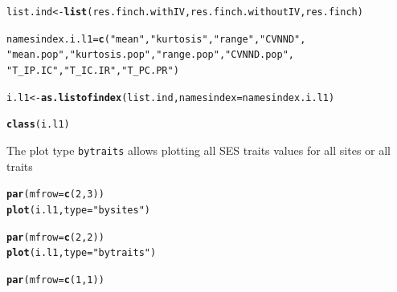 \documentclass[12pt]{article}\usepackage[]{graphicx}\usepackage[]{color}
\makeatletter
\newcommand{\hlnum}[1]{\textcolor[rgb]{0.686,0.059,0.569}{#1}}%
\newcommand{\hlstr}[1]{\textcolor[rgb]{0.192,0.494,0.8}{#1}}%
\newcommand{\hlstd}[1]{\textcolor[rgb]{0.345,0.345,0.345}{#1}}%
\newcommand{\hlkwb}[1]{\textcolor[rgb]{0.69,0.353,0.396}{#1}}%
\newcommand{\hlkwc}[1]{\textcolor[rgb]{0.333,0.667,0.333}{#1}}%
\newcommand{\hlkwd}[1]{\textcolor[rgb]{0.737,0.353,0.396}{\textbf{#1}}}%
\newenvironment{kframe}{%
 \def\at@end@of@kframe{}%
 \ifinner\ifhmode%
  \def\at@end@of@kframe{\end{minipage}}%
  \begin{minipage}{\columnwidth}%
 \fi\fi%
 \def\FrameCommand##1{\hskip\@totalleftmargin \hskip-\fboxsep
 \colorbox{shadecolor}{##1}\hskip-\fboxsep
     \hskip-\linewidth \hskip-\@totalleftmargin \hskip\columnwidth}%
 \MakeFramed {\advance\hsize-\width
   \@totalleftmargin\z@ \linewidth\hsize
   \@setminipage}}%
 {\par\unskip\endMakeFramed%
 \at@end@of@kframe}
\newenvironment{knitrout}{}{} %
\makeatother
\begin{document}
\begin{knitrout}
\color{fgcolor}\begin{kframe}
\begin{alltt}
\hlstd{list.ind}\hlkwb{<-}\hlkwd{list}\hlstd{(res.finch.withIV, res.finch.withoutIV, res.finch)}
\end{alltt}


{\ttfamily\noindent\bfseries\color{errorcolor}{\#\# Error: objet 'res.finch.withIV' introuvable}}\begin{alltt}
\hlstd{namesindex.i.l1} \hlkwb{=} \hlkwd{c}\hlstd{(}\hlstr{"mean"}\hlstd{,} \hlstr{"kurtosis"}\hlstd{,} \hlstr{"range"}\hlstd{,} \hlstr{"CVNND"}\hlstd{,}
         \hlstr{"mean.pop"}\hlstd{,} \hlstr{"kurtosis.pop"}\hlstd{,} \hlstr{"range.pop"}\hlstd{,} \hlstr{"CVNND.pop"}\hlstd{,}
         \hlstr{"T_IP.IC"}\hlstd{,} \hlstr{"T_IC.IR"}\hlstd{,} \hlstr{"T_PC.PR"}\hlstd{)}

\hlstd{i.l1}\hlkwb{<-}\hlkwd{as.listofindex}\hlstd{(list.ind,} \hlkwc{namesindex} \hlstd{= namesindex.i.l1)}
\end{alltt}


{\ttfamily\noindent\bfseries\color{errorcolor}{\#\# Error: objet 'list.ind' introuvable}}\begin{alltt}
\hlkwd{class}\hlstd{(i.l1)}
\end{alltt}


{\ttfamily\noindent\bfseries\color{errorcolor}{\#\# Error: objet 'i.l1' introuvable}}\end{kframe}
\end{knitrout}

The plot type \texttt{bytraits} allows plotting all SES traits values for all sites or all traits
\begin{knitrout}
\color{fgcolor}\begin{kframe}
\begin{alltt}
\hlkwd{par}\hlstd{(}\hlkwc{mfrow} \hlstd{=} \hlkwd{c}\hlstd{(}\hlnum{2}\hlstd{,}\hlnum{3}\hlstd{))}
\hlkwd{plot}\hlstd{(i.l1,}\hlkwc{type} \hlstd{=} \hlstr{"bysites"}\hlstd{)}
\end{alltt}


{\ttfamily\noindent\bfseries\color{errorcolor}{\#\# Error: objet 'i.l1' introuvable}}\begin{alltt}
\hlkwd{par}\hlstd{(}\hlkwc{mfrow} \hlstd{=} \hlkwd{c}\hlstd{(}\hlnum{2}\hlstd{,}\hlnum{2}\hlstd{))}
\hlkwd{plot}\hlstd{(i.l1,}\hlkwc{type} \hlstd{=} \hlstr{"bytraits"}\hlstd{)}
\end{alltt}


{\ttfamily\noindent\bfseries\color{errorcolor}{\#\# Error: objet 'i.l1' introuvable}}\begin{alltt}
\hlkwd{par}\hlstd{(}\hlkwc{mfrow} \hlstd{=} \hlkwd{c}\hlstd{(}\hlnum{1}\hlstd{,}\hlnum{1}\hlstd{))}
\end{alltt}
\end{kframe}
\end{knitrout}
\end{document}
